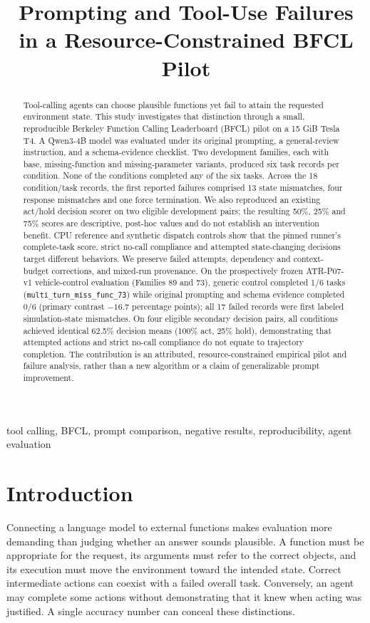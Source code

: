 \documentclass[conference]{IEEEtran}
\title{Prompting and Tool-Use Failures in a Resource-Constrained BFCL Pilot}
\author{\IEEEauthorblockN{Omkar Arjun Mohije}
\IEEEauthorblockA{Roll No: MAI2026006\\
M.Tech in IT (Specialization in AI/ML)\\
Indian Institute of Information Technology, Allahabad\\
AI Tools for Research (ATR) Course Study\\
Email: mai2026006@iiita.ac.in}}
\newcommand{\code}[1]{\texttt{#1}}
\begin{document}
\maketitle
\begin{abstract}
Tool-calling agents can choose plausible functions yet fail to attain the requested environment state. This study investigates that distinction through a small, reproducible Berkeley Function Calling Leaderboard (BFCL) pilot on a 15 GiB Tesla T4. A Qwen3-4B model was evaluated under its original prompting, a general-review instruction, and a schema-evidence checklist. Two development families, each with base, missing-function and missing-parameter variants, produced six task records per condition. None of the conditions completed any of the six tasks. Across the 18 condition/task records, the first reported failures comprised 13 state mismatches, four response mismatches and one force termination. We also reproduced an existing act/hold decision scorer on two eligible development pairs; the resulting 50\%, 25\% and 75\% scores are descriptive, post-hoc values and do not establish an intervention benefit. CPU reference and synthetic dispatch controls show that the pinned runner's complete-task score, strict no-call compliance and attempted state-changing decisions target different behaviors. We preserve failed attempts, dependency and context-budget corrections, and mixed-run provenance. On the prospectively frozen ATR-P07-v1 vehicle-control evaluation (Families 89 and 73), generic control completed 1/6 tasks (\code{multi_turn_miss_func_73}) while original prompting and schema evidence completed 0/6 (primary contrast $-16.7$ percentage points); all 17 failed records were first labeled simulation-state mismatches. On four eligible secondary decision pairs, all conditions achieved identical 62.5\% decision means (100\% act, 25\% hold), demonstrating that attempted actions and strict no-call compliance do not equate to trajectory completion. The contribution is an attributed, resource-constrained empirical pilot and failure analysis, rather than a new algorithm or a claim of generalizable prompt improvement.
\end{abstract}
\begin{IEEEkeywords}
tool calling, BFCL, prompt comparison, negative results, reproducibility, agent evaluation
\end{IEEEkeywords}

\section{Introduction}
Connecting a language model to external functions makes evaluation more demanding than judging whether an answer sounds plausible. A function must be appropriate for the request, its arguments must refer to the correct objects, and its execution must move the environment toward the intended state. Correct intermediate actions can coexist with a failed overall task. Conversely, an agent may complete some actions without demonstrating that it knew when acting was justified. A single accuracy number can conceal these distinctions.
\end{document}
